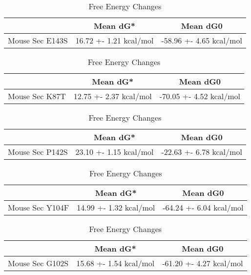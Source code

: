 \begin{table}[ht]
  \centering
  \begin{tabular}{|c|c|c|}
  \hline
    & Mean dG* & Mean dG0 \\
  \hline
  Mouse Sec E143S & 16.72 +- 1.21 kcal/mol & -58.96 +- 4.65 kcal/mol \\
  \hline
  \end{tabular}
  \caption{Free Energy Changes}
\end{table}

\begin{table}[ht]
  \centering
  \begin{tabular}{|c|c|c|}
  \hline
    & Mean dG* & Mean dG0 \\
  \hline
  Mouse Sec K87T & 12.75 +- 2.37 kcal/mol & -70.05 +- 4.52 kcal/mol \\
  \hline
  \end{tabular}
  \caption{Free Energy Changes}
\end{table}

\begin{table}[ht]
  \centering
  \begin{tabular}{|c|c|c|}
  \hline
    & Mean dG* & Mean dG0 \\
  \hline
  Mouse Sec P142S & 23.10 +- 1.15 kcal/mol & -22.63 +- 6.78 kcal/mol \\
  \hline
  \end{tabular}
  \caption{Free Energy Changes}
\end{table}

\begin{table}[ht]
  \centering
  \begin{tabular}{|c|c|c|}
  \hline
    & Mean dG* & Mean dG0 \\
  \hline
  Mouse Sec Y104F & 14.99 +- 1.32 kcal/mol & -64.24 +- 6.04 kcal/mol \\
  \hline
  \end{tabular}
  \caption{Free Energy Changes}
\end{table}

\begin{table}[ht]
  \centering
  \begin{tabular}{|c|c|c|}
  \hline
    & Mean dG* & Mean dG0 \\
  \hline
  Mouse Sec G102S & 15.68 +- 1.54 kcal/mol & -61.20 +- 4.27 kcal/mol \\
  \hline
  \end{tabular}
  \caption{Free Energy Changes}
\end{table}

